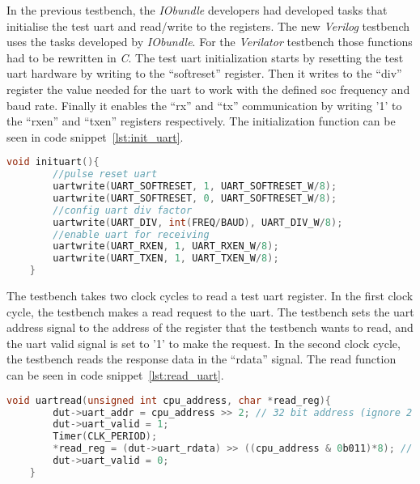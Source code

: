 In the previous testbench, the \textit{IObundle} developers had developed tasks that initialise the test \acrshort{uart} and read/write to the registers. The new \textit{Verilog} testbench uses the tasks developed by \textit{IObundle}. For the \textit{Verilator} testbench those functions had to be rewritten in \textit{C}. The test \acrshort{uart} initialization starts by resetting the test \acrshort{uart} hardware by writing to the \enquote{softreset} register. Then it writes to the \enquote{div} register the value needed for the \acrshort{uart} to work with the defined \acrshort{soc} frequency and baud rate. Finally it enables the \enquote{rx} and \enquote{tx} communication by writing '1' to the \enquote{rxen} and \enquote{txen} registers respectively. The initialization function can be seen in code snippet~\ref{lst:init_uart}.

\begin{lstlisting}[language=C, caption={Function to initialize the test \acrshort{uart}.}, label=lst:init_uart]
    void inituart(){
        //pulse reset uart
        uartwrite(UART_SOFTRESET, 1, UART_SOFTRESET_W/8);
        uartwrite(UART_SOFTRESET, 0, UART_SOFTRESET_W/8);
        //config uart div factor
        uartwrite(UART_DIV, int(FREQ/BAUD), UART_DIV_W/8);
        //enable uart for receiving
        uartwrite(UART_RXEN, 1, UART_RXEN_W/8);
        uartwrite(UART_TXEN, 1, UART_TXEN_W/8);
    }
\end{lstlisting}

The testbench takes two clock cycles to read a test \acrshort{uart} register. In the first clock cycle, the testbench makes a read request to the \acrshort{uart}. The testbench sets the \acrshort{uart} address signal to the address of the register that the testbench wants to read, and the \acrshort{uart} valid signal is set to '1' to make the request. In the second clock cycle, the testbench reads the response data in the \enquote{rdata} signal. The read function can be seen in code snippet~\ref{lst:read_uart}.

\begin{lstlisting}[language=C, caption={Read from the test \acrshort{uart}.}, label=lst:read_uart]
    void uartread(unsigned int cpu_address, char *read_reg){
        dut->uart_addr = cpu_address >> 2; // 32 bit address (ignore 2 LSBs)
        dut->uart_valid = 1;
        Timer(CLK_PERIOD);
        *read_reg = (dut->uart_rdata) >> ((cpu_address & 0b011)*8); // align to 32 bits
        dut->uart_valid = 0;
    }
\end{lstlisting}

